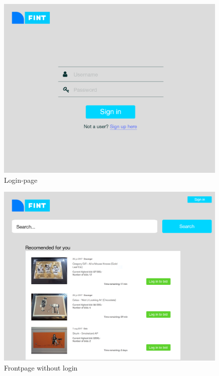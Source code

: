 \begin{figure}[H]
  \caption{Login-page}
  \centering
    \includegraphics[scale=0.38]{figures/Login}
\end{figure}

\begin{figure}[H]
  \caption{Frontpage without login}
  \centering
    \includegraphics[scale=0.38]{figures/Frontpage}
\end{figure}

